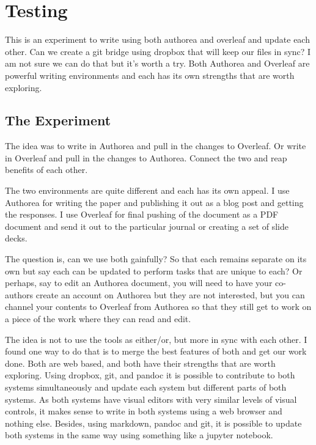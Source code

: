 \section{Testing}

This is an experiment to write using both authorea and overleaf and update each other. Can we create a git bridge using dropbox that will keep our files in sync? I am not sure we can do that but it's worth a try. Both Authorea and Overleaf are powerful writing environments and each has its own strengths that are worth exploring. 

\subsection{The Experiment}

The idea was to write in Authorea and pull in the changes to Overleaf.
Or write in Overleaf and pull in the changes to Authorea. 
Connect the two and reap benefits of each other. 

The two environments are quite different and each has its own appeal. I use Authorea for writing the paper and publishing it out as a blog post and getting the responses. I use Overleaf for final pushing of the document as a PDF document and send it out to the particular journal or creating a set of slide decks. 

The question is, can we use both gainfully? So that each remains separate on its own but say each can be updated to perform tasks that are unique to each? Or perhaps, say to edit an Authorea document, you will need to have your co-authors create an account on Authorea but they are not interested, but you can channel your contents to Overleaf from Authorea so that they still get to work on a piece of the work where they can read and edit. 

The idea is not to use the tools as either/or, but more in sync with each other. I found one way to do that is to merge the best features of both and get our work done. Both are web based, and both have their strengths that are worth exploring. Using dropbox, git, and pandoc it is possible to contribute to both systems simultaneously and update each system but different parts of both systems. As both systems have visual editors with very similar levels of visual controls, it makes sense to write in both systems using a web browser and nothing else. Besides, using markdown, pandoc and git, it is possible to update both systems in the same way using something like a jupyter notebook. 

